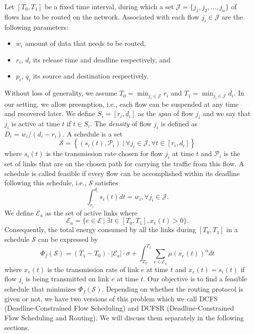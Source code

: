 \documentclass[10pt, conference, compsocconf]{IEEEtran}
\begin{document}
Let $[T_0,T_1]$ be a fixed time interval, during which a set $\mathcal{J} = \{j_1,j_2,\ldots,j_n\}$ of flows has to be routed on the network. Associated with each flow $j_i \in \mathcal{J}$ are the following parameters:
\begin{itemize}
\item $w_i$ amount of data that needs to be routed,
\item $r_i$, $d_i$ its release time and deadline respectively, and
\item $p_i$, $q_i$ its source and destination respectively.
\end{itemize}

Without loss of generality, we assume $T_0 = \min_{j_i\in \mathcal{J}}r_i$ and $T_1 = \min_{j_i\in \mathcal{J}}d_i$. In our setting, we allow preemption, i.e., each flow can be suspended at any time and recovered later. We define $S_i = [r_i, d_i]$ as the \emph{span} of flow $j_i$ and we say that $j_i$ is active at time $t$ if $t \in S_i$. The \emph{density} of flow $j_i$ is defined as $D_i = w_i/(d_i - r_i)$. A schedule is a set 
\begin{equation}
	\mathcal{S} = \left\{(s_i(t),\mathcal{P}_i)~|~\forall j_i \in \mathcal{J}, \forall t \in [r_i,d_i]\right\} 
\end{equation}
where $s_i(t)$ is the transmission rate chosen for flow $j_i$ at time $t$ and $\mathcal{P}_i$ is the set of links that are on the chosen path for carrying the traffic from this flow. A schedule is called feasible if every flow can be accomplished within its deadline following this schedule, i.e., $\mathcal{S}$ satisfies
\begin{equation}
\int_{r_i}^{d_i} s_i(t) dt = w_i, \forall j_i \in \mathcal{J}. 
\end{equation}
We define $\mathcal{E}_a$ as the set of active links where
\begin{equation}
\mathcal{E}_a = \{e \in \mathcal{E}~|~\exists t \in [T_0,T_1], x_e(t) > 0\}.
\end{equation}
Consequently, the total energy consumed by all the links during $[T_0,T_1]$ in a schedule $\mathcal{S}$ can be expressed by
\begin{equation}
\Phi_f(\mathcal{S}) = (T_1-T_0)\cdot|\mathcal{E}_a|\cdot\sigma + \int_{T_0}^{T_1} \sum_{e \in \mathcal{E}_a}\mu\left(x_e(t)\right)^{\alpha}dt  
\end{equation}
where $x_e(t)$ is the transmission rate of link $e$ at time $t$ and $x_e(t) = s_i(t)$ if flow $j_i$ is being transmitted on link $e$ at time $t$. Our objective is to find a feasible schedule that minimizes $\Phi_f(\mathcal{S})$. Depending on whether the routing protocol is given or not, we have two versions of this problem which we call DCFS (Deadline-Constrained Flow Scheduling) and DCFSR (Deadline-Constrained Flow Scheduling and Routing). We will discuss them separately in the following sections. 
\end{document}
